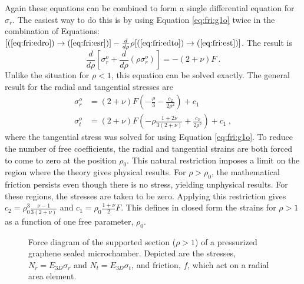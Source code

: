 Again these equations can be combined to form a single differential equation for $\sigma_r$.
The easiest way to do this is by using Equation \ref{eq:fri:g1o} twice in the combination of Equations: $[(\ref{eq:fri:edro}) \rightarrow (\ref{eq:fri:esr})]-\frac{d}{d \rho}\rho[(\ref{eq:fri:edto})\rightarrow(\ref{eq:fri:est})]$.
The result is
\begin{equation}
	\frac{d}{d\rho}[\sigma_r^o+\frac{d}{d\rho}(\rho \sigma_r^o)]=-(2+\nu) F \ .
	\label{eq:fri:comboout}
\end{equation}
Unlike the situation for $\rho<1$, this equation can be solved exactly.
The general result for the radial and tangential stresses are
\begin{align}
	\sigma_r^o&=(2+\nu)F(-\frac{\rho}{3}-\frac{c_2}{2 \rho^2})+c_1 \\
	\sigma_t^o&=(2+\nu)F(-\rho \frac{1+2 \nu}{3(2+\nu)}+\frac{c_2}{2 \rho^2})+c_1 \ ,
\end{align}
where the tangential stress was solved for using Equation \ref{eq:fri:g1o}.
To reduce the number of free coefficients, the radial and tangential strains are both forced to come to zero at the position $\rho_0$.
This natural restriction imposes a limit on the region where the theory gives physical results.
For $\rho>\rho_0$, the mathematical friction persists even though there is no stress, yielding unphysical results.
For these regions, the stresses are taken to be zero.
Applying this restriction gives $c_2=\rho_0^3 \frac{\nu-1}{3(2+\nu)}$ and $c_1=\rho_0 \frac{1+\nu}{2} F$.
This defines in closed form the strains for $\rho>1$ as a function of one free parameter, $\rho_0$.

\begin{figure}
	\begin{center}
	
	\end{center}
	\caption[Force diagram of the supported section of a pressurized graphene sealed microchamber]{\label{fig:fri:stressfigureo} Force diagram of the supported section ($\rho>1$) of a pressurized graphene sealed microchamber.  Depicted are the stresses, $N_r=E_{3D} \sigma_r$ and $N_t=E_{3D} \sigma_t$, and friction, $f$, which act on a radial area element.}
\end{figure}

